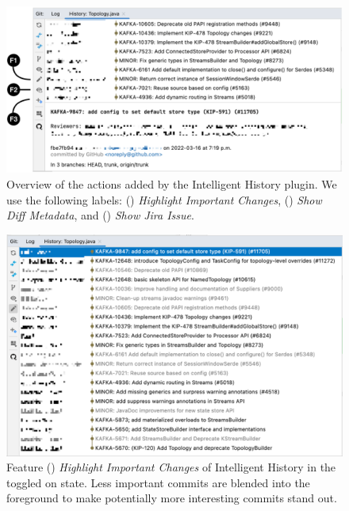 \begin{figure}
    \includegraphics[width=\textwidth]{./images/intelligent-history-overview.png}
    \caption{
        Overview of the actions added by the Intelligent History plugin. 
        We use the following labels: () \textit{Highlight Important Changes}, () \textit{Show Diff Metadata}, and () \textit{Show Jira Issue}.
    }
    \label{fig:Intelligent-History-Overview}
\end{figure}

\begin{figure}
    \includegraphics[width=\textwidth]{./images/intelligent-history-A.png}
    \caption{
        Feature () \textit{Highlight Important Changes} of Intelligent History in the toggled on state. 
        Less important commits are blended into the foreground to make potentially more interesting commits stand out.
    }
    \label{fig:Intelligent-History-A}
\end{figure}


